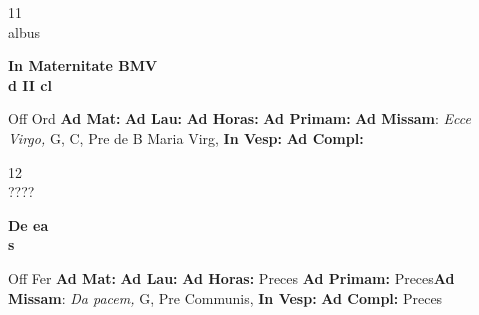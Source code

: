 \documentclass[10pt, openany]{book}
\begin{document}
    \begin{center}
        \begin{minipage}{3.5in}
            \vspace{2em}
            \begin{minipage}{0.5in}
                {\Huge 11} \\
                {\normalsize albus}
            \end{minipage}
            \begin{minipage}{3.0in}
                \textbf{ \large In Maternitate BMV \\
                \textnormal{\normalsize d II cl}}

            \end{minipage}
            \begin{justify}Off Ord
                \textbf{Ad Mat: }
                \textbf{Ad Lau: }
                \textbf{Ad Horas: }
                \textbf{Ad Primam: }\textbf{Ad Missam}: \textit{Ecce Virgo,} G, C, Pre de B Maria Virg, 
                \textbf{In Vesp: }
                \textbf{Ad Compl: }
            \end{justify}
        \end{minipage}
    \end{center}

    \begin{center}
        \begin{minipage}{3.5in}
            \vspace{2em}
            \begin{minipage}{0.5in}
                {\Huge 12} \\
                {\normalsize ????}
            \end{minipage}
            \begin{minipage}{3.0in}
                \textbf{ \large De ea \\
                \textnormal{\normalsize s}}

            \end{minipage}
            \begin{justify}Off Fer
                \textbf{Ad Mat: }
                \textbf{Ad Lau: }
                \textbf{Ad Horas: }Preces
                \textbf{Ad Primam: }Preces\textbf{Ad Missam}: \textit{Da pacem,} G, Pre Communis, 
                \textbf{In Vesp: }
                \textbf{Ad Compl: }Preces
            \end{justify}
        \end{minipage}
    \end{center}
\end{document}
